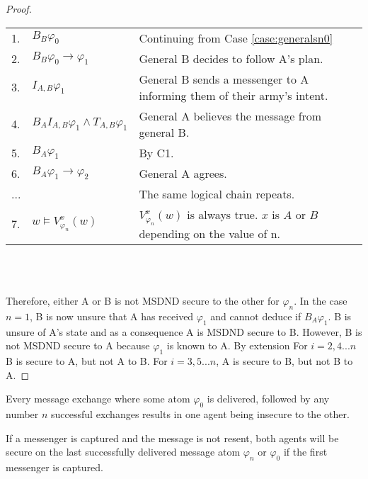\begin{proof}
\begin{table}[H]
\centering
\small
\begin{tabularx}{\linewidth}{l l X}
1. & $B_{B} \varphi_0$ & Continuing from Case \ref{case:generalsn0} \\
2. & $B_{B} \varphi_0 \rightarrow \varphi_1$ & General B decides to follow A's plan. \\
3. & $I_{A,B} \varphi_1$ & General B sends a messenger to A informing them of their army's intent. \\
4. & $B_{A}I_{A,B} \varphi_1 \wedge T_{A,B} \varphi_1$ & General A believes the message from general B. \\
5. & $B_{A}\varphi_1$ & By C1. \\
6. & $B_{A}\varphi_1 \rightarrow \varphi_2$ & General A agrees. \\
...& & The same logical chain repeats. \\
7. & $w \vDash V_{\varphi_n}^{x}(w)$ & $V_{\varphi_n}^{x}(w)$ is always true. $x$ is $A$ or $B$ depending on the value of n. %
\end{tabularx} \\~\\
\label{tab:twoarmiesproof2}
\end{table}

Therefore, either A or B is not MSDND secure to the other for $\varphi_n$.
In the case $n=1$, B is now unsure that A has received $\varphi_1$ and cannot deduce if $B_{A} \varphi_1$. B is unsure of A's state and as a consequence A is MSDND secure to B. However, B is not MSDND secure to A because $\varphi_1$ is known to A. By extension For $i=2,4...n$ B is secure to A, but not A to B. For $i=3,5...n$, A is secure to B, but not B to A.
\end{proof}

\begin{cor}
Every message exchange where some atom $\varphi_0$ is delivered, followed by any number $n$ successful exchanges results in one agent being insecure to the other.
\end{cor}

\begin{thm}
If a messenger is captured and the message is not resent, both agents will be secure on the last successfully delivered message atom $\varphi_{n}$ or $\varphi_0$ if the first messenger is captured.
\label{thm:captured}
\end{thm}

